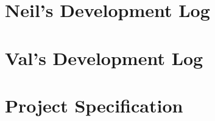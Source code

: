 \documentclass[11pt,a4paper,titlepage]{report}
\begin{document}
\begin{appendices}
\chapter{Neil's Development Log}


\chapter{Val's Development Log}


\chapter{Project Specification}




\end{appendices}

\nocite{*}
\printbibliography[heading=bibintoc]
\end{document}
